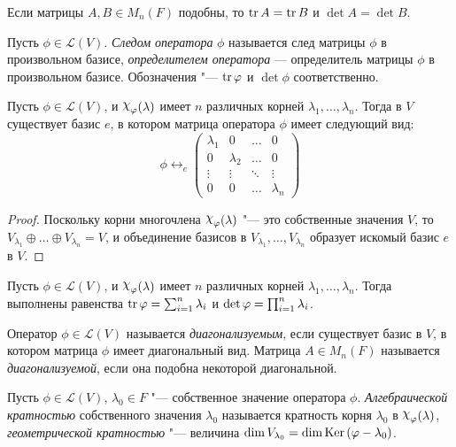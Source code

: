 \begin{corollary}
	Если матрицы $A, B \in M_n(F)$ подобны, то $\operatorname{tr}{A} = \operatorname{tr}{B}$ и $\det{A} = \det{B}$.
\end{corollary}

\begin{definition}
	Пусть $\phi \in \mathcal{L}(V)$. \textit{Следом оператора} $\phi$ называется след матрицы $\phi$ в произвольном базисе, \textit{определителем оператора} --- определитель матрицы $\phi$ в произвольном базисе. Обозначения "--- $\operatorname{tr}{\varphi}$ и $\det{\phi}$ соответственно.
\end{definition}

\begin{theorem}
	Пусть $\phi \in \mathcal{L}(V)$, и $\Chi_\phi(\lambda)$ имеет $n$ различных корней $\lambda_1, \dots, \lambda_n$. Тогда в $V$ существует базис $e$, в котором матрица оператора $\phi$ имеет следующий вид:
	\[\phi \leftrightarrow_e \begin{pmatrix}
		\lambda_1 & 0 & \dots & 0\\
		0 & \lambda_2 & \dots & 0\\
		\vdots & \vdots & \ddots & \vdots\\
		0 & 0 & \dots & \lambda_n
	\end{pmatrix}\]
\end{theorem}

\begin{proof}
	Поскольку корни многочлена $\Chi_\phi(\lambda)$ "--- это собственные значения $V$, то $V_{\lambda_1} \oplus \dots \oplus V_{\lambda_n} = V$, и объединение базисов в $V_{\lambda_1}, \dots, V_{\lambda_n}$ образует искомый базис $e$ в $V$.
\end{proof}

\begin{corollary}
	Пусть $\phi \in \mathcal{L}(V)$, и $\Chi_\phi(\lambda)$ имеет $n$ различных корней $\lambda_1, \dots, \lambda_n$. Тогда выполнены равенства $\operatorname{tr}{\varphi} = \sum_{i = 1}^n\lambda_i$ и $\det{\phi} \hm{=} \prod_{i = 1}^n\lambda_i$.
\end{corollary}

\begin{definition}
	Оператор $\phi \in \mathcal{L}(V)$ называется \textit{диагонализуемым}, если существует базис в $V$, в котором матрица $\phi$ имеет диагональный вид. Матрица $A \in M_n(F)$ называется \textit{диагонализуемой}, если она подобна некоторой диагональной.
\end{definition}

\begin{definition}
	Пусть $\phi \in \mathcal{L}(V)$, $\lambda_0 \in F$ "--- собственное значение оператора $\phi$. \textit{Алгебраической кратностью} собственного значения $\lambda_0$ называется кратность корня $\lambda_0$ в $\Chi_\phi(\lambda)$, \textit{геометрической кратностью} "--- величина $\dim{V_{\lambda_0}} = \dim{\operatorname{Ker}{(\ensuremath{\varphi}- \lambda_0)}}$.
\end{definition}


